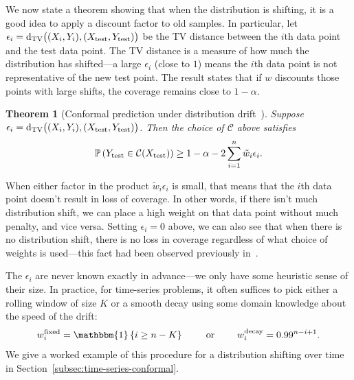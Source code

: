 \documentclass[10pt]{article}
\newtheorem{theorem}{Theorem}
\newcommand{\C}{\mathcal{C}}
\newcommand{\ind}[1]{\mathbbm{1}\left\{#1\right\}}
\renewcommand{\P}{\mathbb{P}}
\begin{document}
We now state a theorem showing that when the distribution is shifting, it is a good idea to apply a discount factor to old samples.
In particular, let $\epsilon_i = \mathrm{d}_{\rm TV}\big( (X_i, Y_i), (X_{\rm test}, Y_{\rm test}) \big)$ be the TV distance between the $i$th data point and the test data point.
The TV distance is a measure of how much the distribution has shifted---a large $\epsilon_i$ (close to $1$) means the $i$th data point is not representative of the new test point.
The result states that if $w$ discounts those points with large shifts, the coverage remains close to $1-\alpha$. 
\begin{theorem}[Conformal prediction under distribution drift~\cite{barber2022conformal}]
\label{thm:tv-bound}
    Suppose $\epsilon_i = \mathrm{d}_{\rm TV}\big( (X_i, Y_i), (X_{\rm test}, Y_{\rm test}) \big)$.
    Then the choice of $\C$ above satisfies
    \begin{equation}
      \P\left( Y_{\rm test} \in \C(X_{\rm test}) \right) \geq 1-\alpha-2\sum\limits_{i=1}^n\tilde{w}_i\epsilon_i.
    \end{equation}
\end{theorem}
When either factor in the product $\tilde{w}_i\epsilon_i$ is small, that means that the $i$th data point doesn't result in loss of coverage. 
In other words, if there isn't much distribution shift, we can place a high weight on that data point without much penalty, and vice versa. 
Setting $\epsilon_i = 0$ above, we can also see that when there is no distribution shift, there is no loss in coverage regardless of what choice of weights is used---this fact had been observed previously in~\cite{guan2020conformal,tibshirani2019conformal}.

The $\epsilon_i$ are never known exactly in advance---we only have some heuristic sense of their size.
In practice, for time-series problems, it often suffices to pick either a rolling window of size $K$ or a smooth decay using some domain knowledge about the speed of the drift:
\begin{equation}
  w_i^{\rm fixed} = \ind{i \geq n - K} \qquad \text{ or } \qquad w_i^{\rm decay} = 0.99^{n - i + 1}.
\end{equation}
We give a worked example of this procedure for a distribution shifting over time in Section~\ref{subsec:time-series-conformal}.
\end{document}
